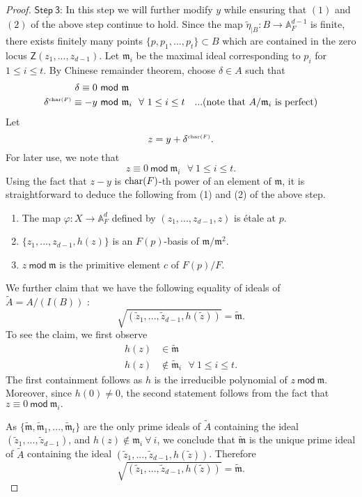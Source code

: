 \documentclass[10pt]{amsart}
\theoremstyle{plain}
\theoremstyle{definition}
\renewcommand{\tilde}{\widetilde}
\newcommand{\A}{{\mathbb A}}
\let\syn\mathsf
\newcommand{\Step}[1]{\underline{\syn{Step \ {#1}}}}
\newcommand{\scr}{\scriptscriptstyle}
\begin{document}
\begin{proof}
\noindent $\Step{3}$: In this step we will further modify $y$ while ensuring that $(1)$ and $(2)$ of the above step continue to hold. Since the map $\tilde{\eta}_{\scr |B}:B\to \A^{d-1}_F$ is finite, there exists finitely many points $\{p,p_1,...,p_t\}\subset B$ which are contained in the zero locus $\syn{Z}(z_{\scr 1},...,z_{\scr d-1})$. Let $\mathfrak{m}_i$ be the maximal ideal corresponding to $p_i$ for $1\leq i \leq t$. 
By Chinese remainder theorem, choose $\delta \in A$ such that
\begin{align*}
\delta \equiv 0 & \ \syn{mod}\ \mathfrak{m} & \\ 
\delta^{\scr {\rm char}(F)} \equiv {-y} & \ \syn{mod} \ \mathfrak{m}_i \ \ \forall \ 1 \leq i \leq t &  ...(\text{note that } A/\mathfrak{m}_i \ \text{is perfect})
\end{align*}
Let $$ z= y+\delta^{\scr {{\rm char}( F)}}.$$
For later use, we note that 
$$ z\equiv 0 \ \syn{mod} \ \mathfrak{m}_i \ \ \ \forall \  1\leq i \leq t.$$
Using the fact that $z-y$ is ${\rm char}(F)$-th power of an element of $\mathfrak{m}$, it is straightforward to deduce the following from (1) and (2) of the above step. 
\begin{enumerate}
\item The map $\varphi: X\to \A^d_F$ defined by $(z_{\scr 1},...,z_{\scr d-1},z)$ is \'{e}tale at $p$. 
\item $\{z_{\scr 1},...,z_{\scr d-1},h(z)\}$ is an $F(p)$-basis of  $\mathfrak{m}/\mathfrak{m}^2$.
\item $z \ \syn{mod}\ \mathfrak{m}$ is the primitive element $c$ of $F(p)/F$.
\end{enumerate} 

We further claim that we have the following equality of  ideals of $\tilde{A}=A/(I(B))$ :
$$\sqrt{\left(\tilde{z}_{\scr 1},...,\tilde{z}_{\scr d-1},h(\tilde{z})\right)} = \tilde{\mathfrak{m}}.$$ To see the claim, we first observe  
\begin{align*}
h(z) & \in \tilde{\mathfrak{m}} \\
h(z) & \notin \tilde{\mathfrak{m}}_i \ \ \ \forall \  1\leq i \leq t.
\end{align*}
The first containment follows as $h$ is the irreducible polynomial of $z \ \syn{mod} \ \mathfrak{m}$. 
Moreover, since $h(0)\neq 0$, the second statement follows from the fact that $z\equiv 0 \ \syn{mod} \ \mathfrak{m}_i.$

As $\{\tilde{\mathfrak{m}},\tilde{\mathfrak{m}}_1,...,\tilde{\mathfrak{m}}_t\}$ are the only prime ideals of $\tilde{A}$ containing the ideal $(\tilde{z}_{\scr 1},...,\tilde{z}_{\scr d-1})$, and $h(z)\notin \mathfrak{m}_i \ \forall \ i$, we conclude that $\tilde{\mathfrak{m}}$ is the unique prime ideal of $\tilde{A}$ containing the ideal 
$\left(\tilde{z}_{\scr 1},...,\tilde{z}_{\scr d-1},h(\tilde{z})\right)$. Therefore 
$$\sqrt{\left(\tilde{z}_{\scr 1},...,\tilde{z}_{\scr d-1},h(\tilde{z})\right)} = \tilde{\mathfrak{m}}.$$ 
 



\end{proof}
\end{document}
